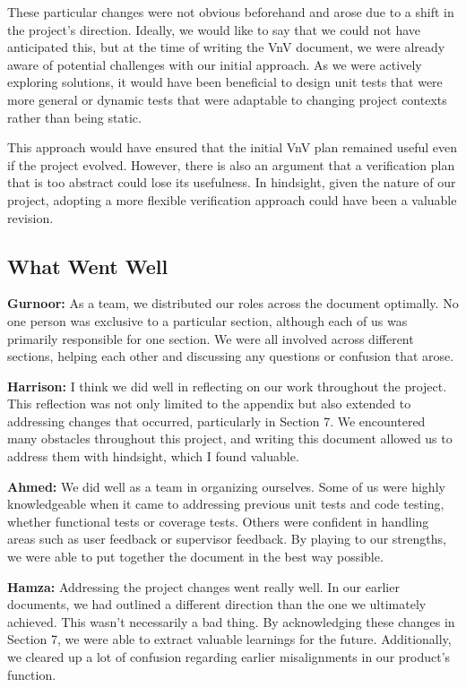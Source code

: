 \documentclass[12pt, titlepage]{article}
\begin{document}
\begin{enumerate}
  These particular changes were not obvious beforehand and arose due to a shift in the project's direction. Ideally, we would like to say that we could not have anticipated this, but at the time of writing the VnV document, we were already aware of potential challenges with our initial approach. As we were actively exploring solutions, it would have been beneficial to design unit tests that were more general or dynamic tests that were adaptable to changing project contexts rather than being static. 
  
  This approach would have ensured that the initial VnV plan remained useful even if the project evolved. However, there is also an argument that a verification plan that is too abstract could lose its usefulness. In hindsight, given the nature of our project, adopting a more flexible verification approach could have been a valuable revision.
  
  \subsection{What Went Well}
  
  \textbf{Gurnoor:} As a team, we distributed our roles across the document optimally. No one person was exclusive to a particular section, although each of us was primarily responsible for one section. We were all involved across different sections, helping each other and discussing any questions or confusion that arose.
  
  \textbf{Harrison:} I think we did well in reflecting on our work throughout the project. This reflection was not only limited to the appendix but also extended to addressing changes that occurred, particularly in Section 7. We encountered many obstacles throughout this project, and writing this document allowed us to address them with hindsight, which I found valuable.
  
  \textbf{Ahmed:} We did well as a team in organizing ourselves. Some of us were highly knowledgeable when it came to addressing previous unit tests and code testing, whether functional tests or coverage tests. Others were confident in handling areas such as user feedback or supervisor feedback. By playing to our strengths, we were able to put together the document in the best way possible.
  
  \textbf{Hamza:} Addressing the project changes went really well. In our earlier documents, we had outlined a different direction than the one we ultimately achieved. This wasn't necessarily a bad thing. By acknowledging these changes in Section 7, we were able to extract valuable learnings for the future. Additionally, we cleared up a lot of confusion regarding earlier misalignments in our product's function.
  

\end{enumerate}
\end{document}
